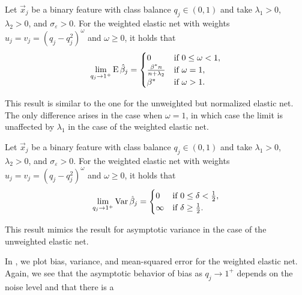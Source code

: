 \begin{theorem}
  \label{thm:weighted-elasticnet-bias}
  Let \(\vec{x}_j\) be a binary feature with class balance \(q_j \in (0, 1)\) and take
  \(\lambda_1 > 0\), \(\lambda_2 > 0\), and \(\sigma_\varepsilon > 0\). For the
  weighted elastic net with weights \(u_j = v_j = (q_j-q_j^2)^\omega\) and \(\omega \geq 0\), it holds that
  \[
    \lim_{q_j \rightarrow 1^+} \operatorname{E} \hat{\beta}_j =
    \begin{cases}
      0                              & \text{if } 0 \leq \omega < 1, \\
      \frac{\beta^*n}{n + \lambda_2} & \text{if } \omega = 1,        \\
      \beta^*                        & \text{if } \omega > 1.
    \end{cases}
  \]
\end{theorem}

This result is similar to the one for the unweighted but normalized elastic net. The only
difference arises in the case when \(\omega = 1\), in which case the limit is unaffected by
\(\lambda_1\) in the case of the weighted elastic net.

\begin{theorem}
  \label{thm:weighted-elasticnet-variance}
  Let \(\vec{x}_j\) be a binary feature with class balance \(q_j \in (0, 1)\) and take
  \(\lambda_1 > 0\), \(\lambda_2 > 0\), and \(\sigma_\varepsilon > 0\). For the
  weighted elastic net with weights \(u_j = v_j = (q_j-q_j^2)^\omega\) and \(\omega \geq 0\), it holds that
  \[
    \lim_{q_j \rightarrow 1^+} \operatorname{Var} \hat{\beta}_j =
    \begin{cases}
      0      & \text{if } 0 \leq \delta < \frac{1}{2}, \\
      \infty & \text{if } \delta \geq \frac{1}{2}.
    \end{cases}
  \]
\end{theorem}

This result mimics the result for asymptotic variance in the case of the unweighted elastic
net.

In , we plot bias, variance, and mean-squared error
for the weighted elastic net. Again, we see that the asymptotic behavior of bias as \(q_j
\rightarrow 1^+\) depends on the noise level and that there is a

